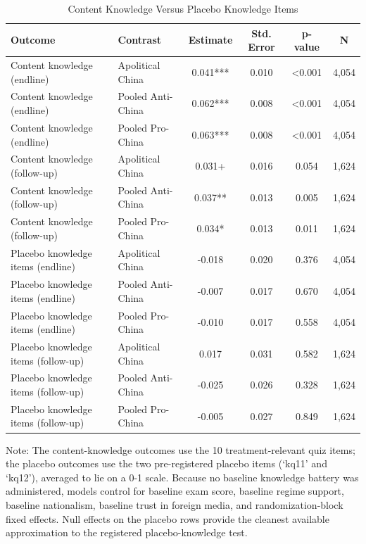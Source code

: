 \begin{table}[H]
\centering
\caption{Content Knowledge Versus Placebo Knowledge Items}
\label{tab:placebo_knowledge}
\footnotesize
\begin{threeparttable}
\begin{tabular}{llcccc}
\toprule
Outcome & Contrast & Estimate & Std. Error & p-value & N \\
\midrule
Content knowledge (endline) & Apolitical China & 0.041*** & 0.010 & <0.001 & 4,054 \\
Content knowledge (endline) & Pooled Anti-China & 0.062*** & 0.008 & <0.001 & 4,054 \\
Content knowledge (endline) & Pooled Pro-China & 0.063*** & 0.008 & <0.001 & 4,054 \\
Content knowledge (follow-up) & Apolitical China & 0.031+ & 0.016 & 0.054 & 1,624 \\
Content knowledge (follow-up) & Pooled Anti-China & 0.037** & 0.013 & 0.005 & 1,624 \\
Content knowledge (follow-up) & Pooled Pro-China & 0.034* & 0.013 & 0.011 & 1,624 \\
Placebo knowledge items (endline) & Apolitical China & -0.018 & 0.020 & 0.376 & 4,054 \\
Placebo knowledge items (endline) & Pooled Anti-China & -0.007 & 0.017 & 0.670 & 4,054 \\
Placebo knowledge items (endline) & Pooled Pro-China & -0.010 & 0.017 & 0.558 & 4,054 \\
Placebo knowledge items (follow-up) & Apolitical China & 0.017 & 0.031 & 0.582 & 1,624 \\
Placebo knowledge items (follow-up) & Pooled Anti-China & -0.025 & 0.026 & 0.328 & 1,624 \\
Placebo knowledge items (follow-up) & Pooled Pro-China & -0.005 & 0.027 & 0.849 & 1,624 \\
\bottomrule
\end{tabular}
\begin{tablenotes}[flushleft]
\footnotesize
\item Note: The content-knowledge outcomes use the 10 treatment-relevant quiz items; the placebo outcomes use the two pre-registered placebo items (`kq11' and `kq12'), averaged to lie on a 0-1 scale. Because no baseline knowledge battery was administered, models control for baseline exam score, baseline regime support, baseline nationalism, baseline trust in foreign media, and randomization-block fixed effects. Null effects on the placebo rows provide the cleanest available approximation to the registered placebo-knowledge test.
\end{tablenotes}
\end{threeparttable}
\end{table}
